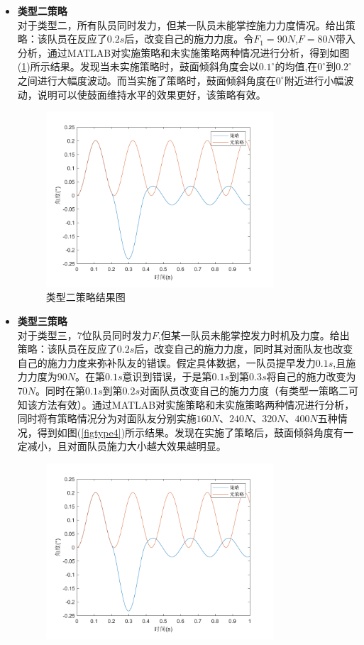 \documentclass{cumcm}
\begin{document}
\begin{itemize}
\item \textbf{类型二策略}\\
对于类型二，所有队员同时发力，但某一队员未能掌控施力力度情况。给出策略：该队员在反应了$0.2s$后，改变自己的施力力度。令$F_1=90N$,$F=80N$带入分析，通过MATLAB对实施策略和未实施策略两种情况进行分析，得到如图(\ref{figtype3})所示结果。发现当未实施策略时，鼓面倾斜角度会以$0.1^{\circ}$的均值,在$0^{\circ}$到$0.2^{\circ}$之间进行大幅度波动。而当实施了策略时，鼓面倾斜角度在$0^{\circ}$附近进行小幅波动，说明可以使鼓面维持水平的效果更好，该策略有效。

\begin{figure}[H]
\centering
\includegraphics[width=0.8\textwidth]{img/type3.pdf}
\caption{类型二策略结果图}
\label{figtype3}
\end{figure}
\item \textbf{类型三策略}\\
对于类型三，$7$位队员同时发力$F$,但某一队员未能掌控发力时机及力度。给出策略：该队员在反应了$0.2s$后，改变自己的施力力度，同时其对面队友也改变自己的施力力度来弥补队友的错误。假定具体数据，一队员提早发力$0.1s$,且施力力度为$90N$。在第$0.1s$意识到错误，于是第$0.1s$到第$0.3s$将自己的施力改变为$70N$。同时在第$0.1s$到第$0.2s$对面队员改变自己的施力力度（有类型一策略二可知该方法有效）。通过MATLAB对实施策略和未实施策略两种情况进行分析，同时将有策略情况分为对面队友分别实施$160N$、$240N$、$320N$、$400N$五种情况，得到如图(\ref{figtype4})所示结果。发现在实施了策略后，鼓面倾斜角度有一定减小，且对面队员施力大小越大效果越明显。
\begin{figure}[H]
\centering
\includegraphics[width=0.8\textwidth]{img/type4.pdf}

\end{figure}
\end{itemize}
\end{document}
